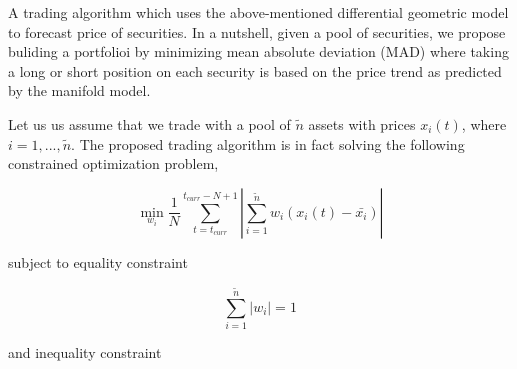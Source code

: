 \documentclass{article}
\begin{document}
A trading algorithm which uses the above-mentioned differential
geometric model to forecast price of securities. In a nutshell, given
a pool of securities, we propose buliding a portfolioi by minimizing
mean absolute deviation (MAD) where taking a long or short position on
each security is based on the price trend as predicted by the manifold
model.

Let us us assume that we trade with a pool of $\tilde{n}$ assets with
prices $x_{i}(t)$, where $i = 1, ...,\tilde{n}$. The proposed trading
algorithm is in fact solving the following constrained optimization
problem,

\begin{equation}\label{eqn:mad-optimization-problem}
\min_{w_{i}} \frac{1}{N}\sum_{t=t_{curr}}^{t_{curr}-N+1}
|\sum_{i=1}^{\tilde{n}} w_{i} (x_{i}(t)-\bar{x_{i}})|
\end{equation}

subject to equality constraint

\begin{equation}\label{eqn:mad-sum-constraint}
\sum_{i=1}^{\tilde{n}} |w_{i}| = 1
\end{equation}

and inequality constraint
\end{document}
